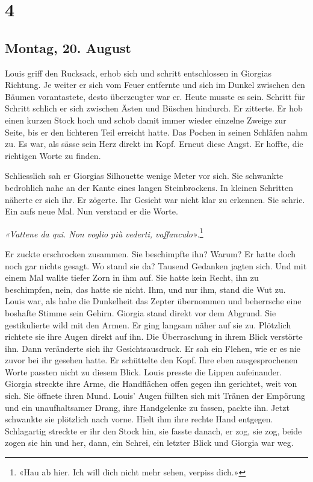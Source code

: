 \chapter{4}

\section{Montag, 20. August}



Louis griff den Rucksack, erhob sich und schritt entschlossen in Giorgias Richtung. 
Je weiter er sich vom Feuer entfernte und sich im Dunkel zwischen den
Bäumen vorantastete, desto überzeugter war er. Heute musste es sein. Schritt für Schritt
schlich er sich zwischen Ästen und Büschen hindurch. Er zitterte. Er hob einen
kurzen Stock hoch und schob damit immer wieder einzelne Zweige zur
Seite, bis er den lichteren Teil erreicht hatte. Das Pochen in seinen
Schläfen nahm zu. Es war, als sässe sein Herz direkt im Kopf. Erneut 
diese Angst. Er hoffte, die richtigen Worte zu finden.

Schliesslich sah er Giorgias Silhouette wenige Meter vor sich.
Sie schwankte bedrohlich nahe an der Kante eines langen Steinbrockens.
In kleinen Schritten näherte er sich ihr. Er zögerte. Ihr Gesicht war
nicht klar zu erkennen. Sie schrie. Ein aufs neue Mal. Nun verstand er
die Worte.

\emph{«Vattene da qui. Non voglio più vederti, vaffanculo»}.\footnote{«Hau ab hier. Ich will dich nicht mehr sehen, verpiss dich.»}

Er zuckte erschrocken zusammen. Sie beschimpfte ihn? Warum? Er hatte doch noch gar nichts
gesagt. Wo stand sie da? Tausend Gedanken jagten sich.
Und mit einem Mal wallte tiefer Zorn in ihm auf.
Sie hatte kein Recht, ihn zu beschimpfen, nein, das hatte sie
nicht. Ihm, und nur ihm, stand die Wut zu. Louis war, als habe die
Dunkelheit das Zepter übernommen und beherrsche eine boshafte Stimme sein Gehirn. 
Giorgia stand direkt vor dem Abgrund.
Sie gestikulierte wild mit den Armen. Er ging langsam näher auf sie zu. Plötzlich
richtete sie ihre Augen direkt auf ihn. Die Überraschung in ihrem Blick
verstörte ihn. Dann veränderte sich ihr Gesichtsausdruck. Er sah ein
Flehen, wie er es nie zuvor bei ihr gesehen hatte. Er schüttelte den
Kopf. Ihre eben ausgesprochenen Worte passten nicht zu diesem Blick.
Louis presste die Lippen aufeinander. Giorgia streckte ihre Arme, die
Handflächen offen gegen ihn gerichtet, weit von sich. Sie öffnete ihren
Mund.
Louis’ Augen füllten sich mit Tränen der Empörung und ein unaufhaltsamer
Drang, ihre Handgelenke zu fassen, packte ihn.
Jetzt schwankte sie plötzlich nach vorne. Hielt ihm ihre rechte Hand
entgegen. Schlagartig streckte er ihr den Stock hin, sie fasste danach,
er zog, sie zog, beide zogen sie hin und her, dann, ein Schrei, ein
letzter Blick und Giorgia war weg.\\

